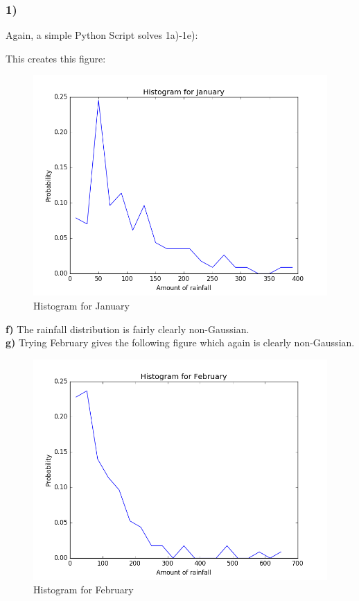\documentclass[a4paper,10pt,english]{article}
\begin{document}
\subsubsection*{1)}
Again, a simple Python Script solves 1a)-1e):

This creates this figure:\\
\begin{figure}[h!]
        \centering 
        \includegraphics[scale=0.5]{january.png} 
        \caption{Histogram for January}
        \label{fig:January}
\end{figure}
\textbf{f)} The rainfall distribution is fairly clearly non-Gaussian.\\
\pagebreak
\textbf{g)} Trying February gives the following figure which again is clearly non-Gaussian.
\begin{figure}[h!]
        \centering 
        \includegraphics[scale=0.5]{February.png} 
        \caption{Histogram for February}
        \label{fig:February}
\end{figure}
\end{document}
